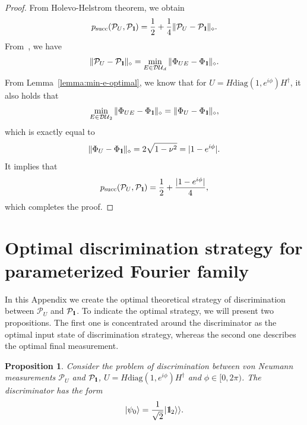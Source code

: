 \documentclass[preprint,12pt, a4paper, dvipsnames]{elsarticle}
\newcommand{\ket}[1]{\ensuremath{|#1\rangle}}
\newcommand{\1}{{\rm 1\hspace{-0.9mm}l}}
\newcommand{\Id}{{\rm 1\hspace{-0.9mm}l}}
\newcommand{\PP}{\mathcal{P}}
\newcommand{\diaguni}{\ensuremath{\mathcal{DU}}}
\newcommand{\diag}{\mathrm{diag}}
\newtheorem{proposition}{Proposition}
\theoremstyle{definition}
\begin{document}
\begin{proof}
	From Holevo-Helstrom theorem, we obtain
	\begin{equation}
	p_{\text{succ}}(\PP_{U}, \PP_{\Id}) = \frac{1}{2} + \frac{1}{4} \| \PP_{U} - \PP_{\Id} \|_\diamond.
	\end{equation}
	From~\cite[Theorem 1]{puchala2018strategies}, we have
	\begin{equation}
	\|\PP_U - \PP_\Id\|_\diamond = \min_{E \in \diaguni_d} \|\Phi_{UE} -
	\Phi_\Id\|_\diamond.
	\end{equation}
	From Lemma~\ref{lemma:min-e-optimal},  we know that for
	$U =  H \diag(1, e^{i \phi}) H^\dagger$,  it also holds that
	\begin{equation}
	\min_{E \in \diaguni_2} \|\Phi_{UE} -
	\Phi_\Id\|_\diamond = \|\Phi_{U} -
	\Phi_\Id\|_\diamond,
	\end{equation} which is exactly equal to
	\begin{equation}
	\|\Phi_{U} -
	\Phi_\Id\|_\diamond = 2\sqrt{1 - \nu^2} = |1-e^{i   \phi }|.
	\end{equation}
	It implies that
	\begin{equation}
	p_{\text{succ}}(\PP_{U}, \PP_{\Id}) = \frac{1}{2} + \frac{|1-e^{i \phi}|}{4},
	\end{equation} which completes the proof.
\end{proof}

\section{Optimal discrimination strategy for parameterized Fourier family} \label{app:optimal-strategy}

In this Appendix we create the optimal
theoretical strategy of  discrimination between $\PP_{U}$ and $\PP_{\Id}$.
To indicate the optimal strategy, we will present two propositions. The first one is concentrated around the discriminator as the optimal input state of discrimination strategy, whereas the second one describes the optimal final measurement.

\begin{proposition}\label{prop-discrim}
	Consider the problem of discrimination between von Neumann measurements $\PP_U$
	and $\PP_\1$, $U = H\diag(1, e^{i \phi}) H^\dagger $ and $\phi \in [0,
	2\pi)$.  The  discriminator has the form
	\begin{equation}
	\ket{\psi_{0}} = \frac{1}{\sqrt{2}} |\Id_2 \rangle \rangle.
	\end{equation}
\end{proposition}
\end{document}
